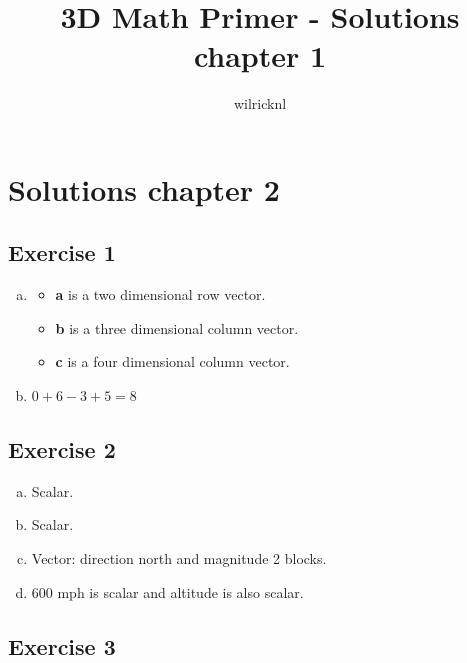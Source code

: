 \documentclass[11pt]{article}
\author{wilricknl}
\title{3D Math Primer - Solutions chapter 1}
\begin{document}
\maketitle

\section{Solutions chapter 2}

\subsection{Exercise 1}

\begin{enumerate}[a.]
    \item
    \begin{itemize}
        \item \textbf{a} is a two dimensional row vector.
        \item \textbf{b} is a three dimensional column vector.
        \item \textbf{c} is a four dimensional column vector.
    \end{itemize}
    \item $0 + 6 - 3 + 5 = 8$
\end{enumerate}

\subsection{Exercise 2}

\begin{enumerate}[a.]
	\item Scalar.
	\item Scalar.
	\item Vector: direction north and magnitude 2 blocks.
	\item 600 mph is scalar and altitude is also scalar.
\end{enumerate}


\subsection{Exercise 3}
\end{document}

